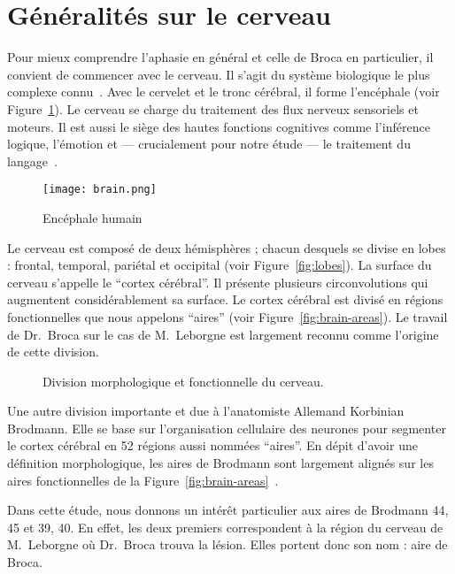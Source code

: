 \section{Généralités sur le cerveau}

Pour mieux comprendre l'aphasie en général et celle de Broca en particulier, 
il convient de commencer avec le cerveau.
Il s'agit du système biologique le plus complexe connu~\cite{}.
Avec le cervelet et le tronc cérébral, il forme l'encéphale (voir Figure~\ref{fig:brain}).
Le cerveau se charge du traitement des flux nerveux sensoriels et moteurs.
Il est aussi le siège des hautes fonctions cognitives comme l'inférence logique, l'émotion 
et --- crucialement pour notre étude --- le traitement du langage~\cite{}.

\begin{figure}[htb]
    \begin{center}
        \texttt{[image: brain.png]}
    \end{center}
    \caption{Encéphale humain}
    \label{fig:brain}
\end{figure}

Le cerveau est composé de deux hémisphères ; chacun desquels se divise en lobes : 
frontal, temporal, pariétal et occipital (voir Figure~\ref{fig:lobes}).
La surface du cerveau s'appelle le ``cortex cérébral''.
Il présente plusieurs circonvolutions qui augmentent considérablement sa surface.
Le cortex cérébral est divisé en régions fonctionnelles que nous appelons ``aires''
(voir Figure~\ref{fig:brain-areas}).
Le travail de Dr.~Broca sur le cas de M.~Leborgne est largement reconnu comme l'origine de cette division.


\begin{figure}[htb]
    \begin{center}
    \end{center}
    \caption{Division morphologique et fonctionnelle du cerveau.}
\end{figure}

Une autre division importante et due à l'anatomiste Allemand Korbinian Brodmann.
Elle se base sur l'organisation cellulaire des neurones pour segmenter le cortex cérébral en 52 régions 
aussi nommées ``aires''.
En dépit d'avoir une définition morphologique, 
les aires de Brodmann sont largement alignés sur les aires fonctionnelles 
de la Figure~\ref{fig:brain-areas}~\cite{Brodmann_2007}.

Dans cette étude, nous donnons un intérêt particulier aux aires de Brodmann 44, 45 et 39, 40.
En effet, les deux premiers correspondent à la région du cerveau de M.~Leborgne où Dr.~Broca trouva la lésion.
Elles portent donc son nom : aire de Broca.